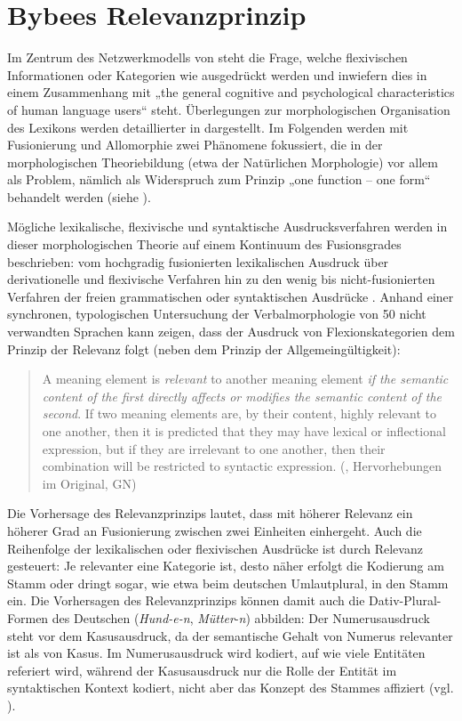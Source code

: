 \section{Bybees Relevanzprinzip}
\label{sec:5.2}

Im Zentrum des Netzwerkmodells von \citet{Bybee1985b} steht die Frage, welche flexivischen Informationen oder Kategorien wie ausgedrückt werden und inwiefern dies in einem Zusammenhang mit „the general cognitive and psychological characteristics of human language users“ \citep[3]{Bybee1985b} steht.  Überlegungen zur morphologischen Organisation des Lexikons werden detaillierter in  dargestellt. Im Folgenden werden mit Fusionierung und Allomorphie zwei Phänomene fokussiert, die in der morphologischen Theoriebildung (etwa der Natürlichen Morphologie) vor allem als Problem, nämlich als Widerspruch zum Prinzip „one function -- one form“ behandelt werden (siehe ).

Mögliche lexikalische, flexivische und syntaktische Ausdrucksverfahren werden in dieser morphologischen Theorie auf einem Kontinuum des Fusionsgrades beschrieben: vom hochgradig fusionierten lexikalischen Ausdruck über derivationelle und flexivische Verfahren hin zu den wenig bis nicht-fusionierten Verfahren der freien grammatischen oder syntaktischen Ausdrücke \citep[12]{Bybee1985b}. Anhand einer synchronen, typologischen Untersuchung der Verbalmorphologie von 50 nicht verwandten Sprachen kann \citet{Bybee1985b} zeigen, dass der Ausdruck von Flexionskategorien dem Prinzip der Relevanz folgt (neben dem Prinzip der Allgemeingültigkeit):

\begin{quote}
A meaning element is \textit{relevant} to another meaning element \textit{if the semantic content of the first directly affects or modifies the semantic content of the second}. If two meaning elements are, by their content, highly relevant to one another, then it is predicted that they may have lexical or inflectional expression, but if they are irrelevant to one another, then their combination will be restricted to syntactic expression. (\citealt[13]{Bybee1985b}, Hervorhebungen im Original, GN)
\end{quote}

Die Vorhersage des Relevanzprinzips lautet, dass mit höherer Relevanz ein höherer Grad an Fusionierung zwischen zwei Einheiten einhergeht. Auch die Reihenfolge der lexikalischen oder flexivischen Ausdrücke ist durch Relevanz gesteuert: Je relevanter eine Kategorie ist, desto näher erfolgt die Kodierung am Stamm oder dringt sogar, wie etwa beim deutschen Umlautplural, in den Stamm ein. Die Vorhersagen des Relevanzprinzips können damit auch die Dativ-Plural-Formen des Deutschen (\textit{Hund-e-n}, \textit{Mütter}{}-\textit{n}) abbilden: Der Numerusausdruck steht vor dem Kasusausdruck, da der semantische Gehalt von Numerus relevanter ist als von Kasus. Im Numerusausdruck wird kodiert, auf wie viele Entitäten referiert wird, während der Kasusausdruck nur die Rolle der Entität im syntaktischen Kontext kodiert, nicht aber das Konzept des Stammes affiziert (vgl. \citealt[34]{Bybee1985b}).

